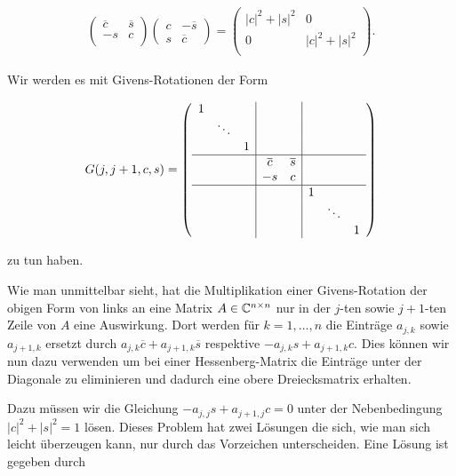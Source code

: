 \documentclass{article}
\theoremstyle{plain}
\begin{document}
\begin{align*}
\left(\begin{array}{cc}
\overline{c}& \overline{s} \\
-s & c\\
\end{array}\right)\left(\begin{array}{cc}
c & -\overline{s} \\
s & \overline{c}
\end{array}\right)
=
\left(\begin{array}{cc}
|c|^2 + |s|^2 & 0 \\
0 & |c|^2 + |s|^2 \\
\end{array}\right).
\end{align*}


Wir werden es mit Givens-Rotationen der Form

$$
G(j,j+1,c,s) =
    \left(\begin{array}{ccc|cc|ccc}
    1 & & & & & & & \\
    & \ddots & & & & & & \\
    & & 1 & & & & & \\
    \hline
    & & & \overline{c} & \overline{s} & & & \\
    & & & -s & c & & &\\
    \hline
    & & & & & 1 & & \\
    & & & & & & \ddots & \\
    & & & & & & & 1\\
    \end{array}\right)
$$

zu tun haben.

Wie man unmittelbar sieht, hat die Multiplikation einer Givens-Rotation der obigen Form von links an eine Matrix $A\in \mathbb{C}^{n\times n}$ nur in der $j$-ten sowie $j+1$-ten Zeile von $A$ eine Auswirkung. Dort werden für $k = 1,\dots, n$ die Einträge $a_{j,k}$ sowie $a_{j+1, k}$ ersetzt durch $a_{j,k}\overline{c} + a_{j+1, k}\overline{s}$ respektive $-a_{j,k}s + a_{j+1, k}c$. Dies können wir nun dazu verwenden um bei einer Hessenberg-Matrix die Einträge unter der Diagonale zu eliminieren und dadurch eine obere Dreiecksmatrix erhalten.

Dazu müssen wir die Gleichung $-a_{j,j}s + a_{j+1, j}c = 0$ unter der Nebenbedingung $|c|^2 + |s|^2 = 1$ lösen. Dieses Problem hat zwei Lösungen die sich, wie man sich leicht überzeugen kann, nur durch das Vorzeichen unterscheiden. Eine Lösung ist gegeben durch
\end{document}
